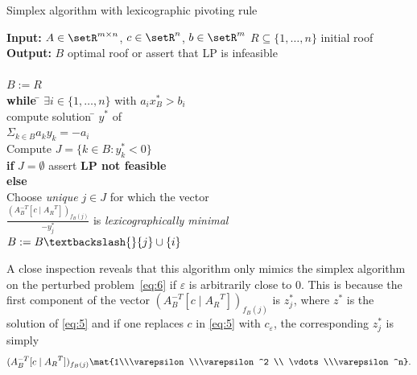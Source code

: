    

   \begin{algorithm}{Simplex algorithm with lexicographic pivoting
       rule} \label{alg:3}
     
     \begin{tabbing}
       {\bf Input:} $A \in \setR^{m\times n}$, $c \in \setR^n$, $b
       \in \setR^m$
       $R\subseteq\{1,\ldots,n\}$  initial roof \\
      {\bf Output:}  $B$ optimal roof  or assert that LP is infeasible\\
      \\ 
      $B := R$  \\
       {\bf while } \= $\exists i \in\{1,\ldots,n\}$ with $a_ix^*_B >b_i$ \\
                   \> compute solution  \=  $y^*$ of \\
\> \>    $\Sigma_{k \in  B}  a_k y_k   =  -a_i $ \\
\> Compute  $J  = \{ k \in B \colon y^*_k <0\}$ \\

\> {\bf if }   $J = \emptyset$ assert {\bf LP not feasible} \\
\> {\bf else}\=      \\
\> \> Choose \emph{unique}  $j  \in J$ for which the vector \\
\> \> $\frac{(A_B^{-T} [c \mid {A_R}^T])_{f_B(j)}}{  - y^*_j}$ is \emph{ lexicographically
  minimal} \\
\> \> $B := B \textbackslash{} \{j\} \cup\{i\}$       
    \end{tabbing}
  \end{algorithm}
  A close inspection reveals that this algorithm only mimics the simplex
  algorithm on the perturbed problem~\eqref{eq:6} if $\varepsilon$ is
  arbitrarily close to $0$. This is because the first component of the
  vector $(A_B^{-T} [c \mid {A_R}^T])_{f_B(j)}$ is $z^*_j$, where $z^*$ is
  the solution of \eqref{eq:5} and if one replaces $c$ in
  \eqref{eq:5} with $c_\varepsilon$, the corresponding $z^*_j$ is simply 
  \begin{equation}
    \label{eq:50}
    (A_B^{-T} [c \mid {A_R}^T])_{f_B(j)} \mat{1\\\varepsilon\\\varepsilon^2 \\ \vdots\\\varepsilon^n}. 
  \end{equation}
  
